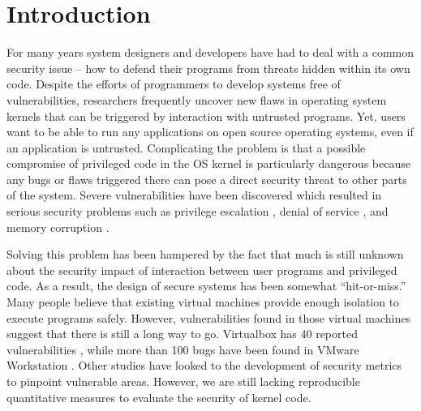 \section{Introduction}
\label{sec.introduction}

For many years system designers and developers have had to deal with a common security issue -- 
how to defend their programs from threats hidden within its own code. Despite the efforts of programmers 
to develop systems free of vulnerabilities, researchers frequently uncover new flaws in operating system kernels that 
can be triggered by interaction with untrusted programs. Yet, users want to be able to run any applications 
on open source operating systems, even if an application is untrusted. Complicating the problem is that 
a possible compromise of privileged code in the OS kernel is particularly dangerous because any bugs or flaws triggered there 
can pose a direct security threat to other parts of the system. Severe vulnerabilities have been discovered 
which resulted in serious security problems such as privilege escalation \cite{CVE-2016-0728, CVE-2015-8660}, 
denial of service \cite{CVE-2015-8539, CVE-2015-5364}, and memory corruption \cite{CVE-2014-9529}.

Solving this problem has been hampered by the fact that much is still unknown about the security impact of 
interaction between user programs and privileged code. As a result, the design of secure systems has been 
somewhat ``hit-or-miss.'' Many people believe that existing virtual machines provide enough isolation to 
execute programs safely. However, vulnerabilities found in those virtual machines suggest that there is still a long way to go. 
Virtualbox has 40 reported vulnerabilities \cite{Virtualbox-Vulnerabilities}, 
while more than 100 bugs have been found in VMware Workstation \cite{VMWare-Vulnerabilities}. 
Other studies have looked to the development of security metrics \cite{PittSFIeld, ozment2006milk} to pinpoint vulnerable areas. 
However, we are still lacking reproducible quantitative measures to evaluate the security of kernel code. 

